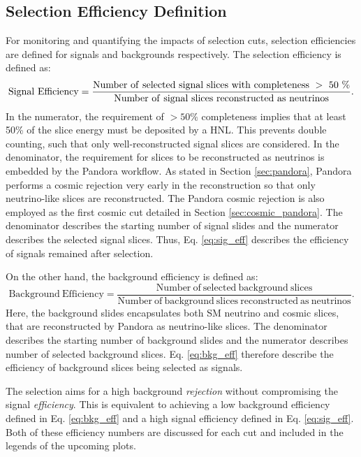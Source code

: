 \subsection{Selection Efficiency Definition}
\label{sec:select_eff}

For monitoring and quantifying the impacts of selection cuts, selection efficiencies are defined for signals and backgrounds respectively.
The selection efficiency is defined as:
\begin{equation}
	\label{eq:sig_eff}
	\mathrm{Signal\ Efficiency = \frac{Number\ of\ selected\ signal\ slices\ with\ completeness\ >\ 50\ \%}{Number\ of\ signal\ slices\ reconstructed\ as\ neutrinos}}. \\
\end{equation}
In the numerator, the requirement of $> 50\%$ completeness implies that at least 50\% of the slice energy must be deposited by a HNL.
This prevents double counting, such that only well-reconstructed signal slices are considered.
In the denominator, the requirement for slices to be reconstructed as neutrinos is embedded by the Pandora workflow.
As stated in Section \ref{sec:pandora}, Pandora performs a cosmic rejection very early in the reconstruction so that only neutrino-like slices are reconstructed.
The Pandora cosmic rejection is also employed as the first cosmic cut detailed in Section \ref{sec:cosmic_pandora}.
The denominator describes the starting number of signal slides and the numerator describes the selected signal slices.
Thus, Eq. \ref{eq:sig_eff} describes the efficiency of signals remained after selection. 

On the other hand, the background efficiency is defined as:
\begin{equation}
	\label{eq:bkg_eff}
	\mathrm{Background\ Efficiency = \frac{Number\ of\ selected\ background\ slices}{Number\ of\ background\ slices\ reconstructed\ as\ neutrinos}}.
\end{equation}
Here, the background slides encapsulates both SM neutrino and cosmic slices, that are reconstructed by Pandora as neutrino-like slices.
The denominator describes the starting number of background slides and the numerator describes number of selected background slices. 
Eq. \ref{eq:bkg_eff} therefore describe the efficiency of background slices being selected as signals.

The selection aims for a high background \textit{rejection} without compromising the signal \textit{efficiency}.        
This is equivalent to achieving a low background efficiency defined in Eq. \ref{eq:bkg_eff} and a high signal efficiency defined in Eq. \ref{eq:sig_eff}.
Both of these efficiency numbers are discussed for each cut and included in the legends of the upcoming plots.                                                                                             

